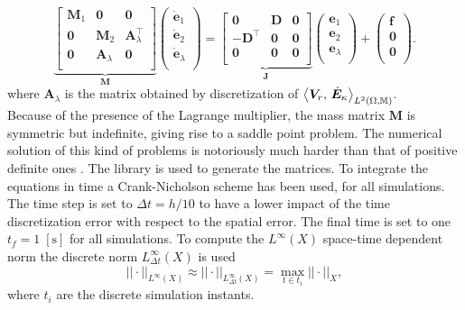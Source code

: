 \begin{equation*}
\underbrace{
	\begin{bmatrix}
	\mathbf{M}_1 & \mathbf{0} & \mathbf{0}\\
	\mathbf{0} & \mathbf{M}_2 & \mathbf{A}_\lambda^\top\\
	\mathbf{0} & \mathbf{A}_\lambda & \mathbf{0} \\
	\end{bmatrix}}_{\mathbf{M}}
\begin{pmatrix}
\dot{\mathbf{e}}_1 \\
\dot{\mathbf{e}}_2 \\
\dot{\mathbf{e}}_{\lambda} \\
\end{pmatrix} = 
\underbrace{
	\begin{bmatrix}
	\mathbf{0} & \mathbf{D} & \mathbf{0}\\
	-\mathbf{D}^\top & \mathbf{0} & \mathbf{0} \\
	\mathbf{0} & \mathbf{0} & \mathbf{0} \\
	\end{bmatrix}}_{\mathbf{J}}
\begin{pmatrix}
{\mathbf{e}}_1 \\
{\mathbf{e}}_2 \\
{\mathbf{e}}_{\lambda} \\
\end{pmatrix} + 
\begin{pmatrix}
\mathbf{f} \\
\mathbf{0} \\
\mathbf{0} \\
\end{pmatrix}. 
\end{equation*}
where $\mathbf{A}_\lambda$ is the matrix obtained by discretization of $\inner[L^2(\Omega, \mathbb{M})]{\bm{V}_r}{\dot{\bm{E}}_\kappa}$. \\
Because of the presence of the Lagrange multiplier, the mass matrix $\mathbf{M}$ is symmetric but indefinite, giving rise to a saddle point problem. The numerical solution of this kind of problems is notoriously much harder than that of positive definite ones \cite{benzi2005}. The {} library \cite{rathgeber2017firedrake} is used to generate the matrices. To integrate the equations in time a Crank-Nicholson scheme has been used, for all simulations. The time step is set to $\Delta t = h/10$ to have a lower impact of the time discretization error with respect to the spatial error. The final time is set to one $t_f = 1 \; [\textrm{s}]$ for all simulations. To compute the $L^\infty ({X})$ space-time dependent norm  the discrete norm $L^\infty_{\Delta t} ({X})$ is used
\[
||\cdot ||_{L^\infty ({X})} \approx || \cdot ||_{L^\infty_{\Delta t} ({X})} = \max_{t \in t_i} ||\cdot||_{{X}},
\]
where $t_i$ are the discrete simulation instants. 


